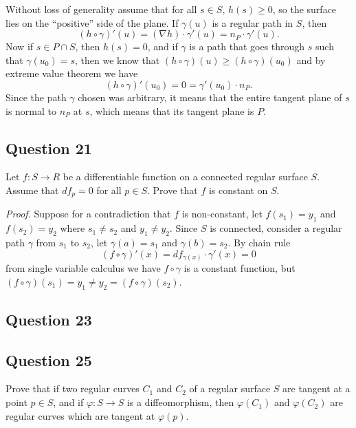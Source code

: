 \documentclass[12pt]{article}
\begin{document}
Without loss of generality assume that for all \(s\in S\), \(h(s) \geq 0\), so the surface lies on the ``positive'' side of the plane.
If \(\gamma(u)\) is a regular path in \(S\), then
\[ (h\circ \gamma)'(u) = (\nabla h)\cdot \gamma'(u) = n_P \cdot \gamma'(u).\]
Now if \(s \in P\cap S\), then \(h(s) = 0\),
and if \(\gamma\) is a path that goes through \(s\) such that \(\gamma(u_0) = s\),
then we know that \((h\circ\gamma)(u) \geq (h\circ\gamma)(u_0)\) and by extreme value theorem we have
\[ (h\circ\gamma)'(u_0) = 0 = \gamma'(u_0)\cdot n_P. \]
Since the path \(\gamma\) chosen was arbitrary, it means that the entire tangent plane of \(s\) is normal to \(n_P\) at \(s\), which means that its tangent plane is \(P\).

\subsection*{Question 21}

Let \(f: S\to R\) be a differentiable function on a connected regular surface \(S\).
Assume that \(df_p = 0\) for all \(p\in S\).
Prove that \(f\) is constant on \(S\).

\emph{Proof.}
Suppose for a contradiction that \(f\) is non-constant, let \(f(s_1) = y_1\) and \(f(s_2) = y_2\) where \(s_1 \ne s_2\) and \(y_1 \ne y_2\).
Since \(S\) is connected, consider a regular path \(\gamma\) from \(s_1\) to \(s_2\), let \(\gamma(a) = s_1\) and \(\gamma(b) = s_2\).
By chain rule
\[ (f\circ \gamma)'(x) = df_{\gamma(x)}\cdot \gamma'(x) = 0 \]
from single variable calculus we have \(f\circ\gamma\) is a constant function,
but \((f\circ\gamma)(s_1) = y_1 \ne y_2 = (f\circ\gamma)(s_2)\).

\subsection*{Question 23}

\subsection*{Question 25}
Prove that if two regular curves $C_1$ and $C_2$ of a regular surface $S$ are tangent at a point $p \in S$, and if $\varphi: S \to S$ is a diffeomorphism, then $\varphi(C_1)$ and $\varphi(C_2)$ are regular curves which are tangent at $\varphi(p)$.\\
\end{document}
